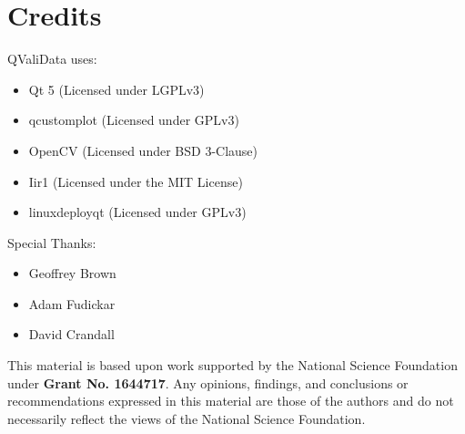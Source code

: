 \documentclass[]{article}
\begin{document}
	\section{Credits}
	QValiData uses:
		\begin{itemize}
			\item Qt 5 (Licensed under LGPLv3)
			\item qcustomplot (Licensed under GPLv3)
			\item OpenCV (Licensed under BSD 3-Clause)
			\item Iir1 (Licensed under the MIT License)
			\item linuxdeployqt (Licensed under GPLv3)
		\end{itemize}
	Special Thanks:
		\begin{itemize}
			\item Geoffrey Brown
			\item Adam Fudickar
			\item David Crandall
		\end{itemize}
	This material is based upon work supported by the National Science Foundation under \textbf{Grant No. 1644717}.
	Any opinions, findings, and conclusions or recommendations expressed in this material are those of the authors and do not necessarily reflect the views of the National Science Foundation.
\end{document}
